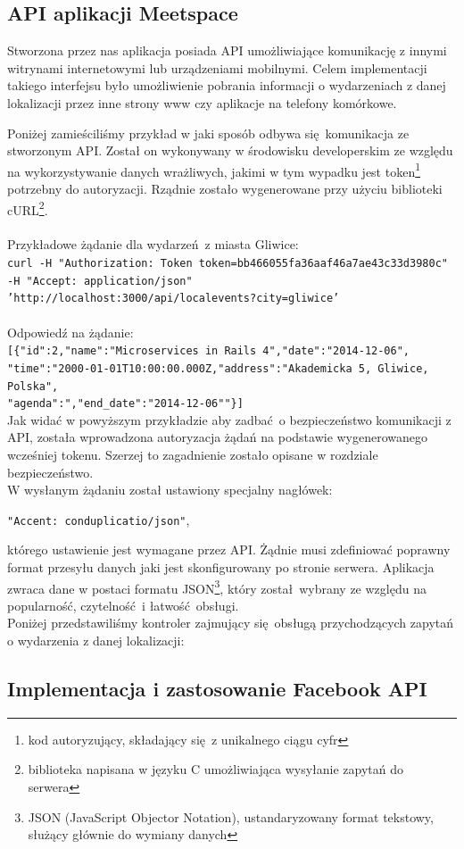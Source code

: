 \subsection{API aplikacji Meetspace}
  Stworzona przez nas aplikacja posiada API umożliwiające komunikację z innymi witrynami internetowymi lub urządzeniami mobilnymi. Celem implementacji takiego interfejsu było umożliwienie pobrania informacji o wydarzeniach z danej lokalizacji przez inne strony www czy aplikacje na telefony komórkowe.


  Poniżej zamieściliśmy przykład w jaki sposób odbywa się komunikacja ze stworzonym API. Został on wykonywany w środowisku developerskim ze względu na wykorzystywanie danych wrażliwych, jakimi w tym wypadku jest token\footnote{kod autoryzujący, składający się z unikalnego ciągu cyfr} potrzebny do autoryzacji. Rządnie zostało wygenerowane przy użyciu biblioteki cURL\footnote{biblioteka napisana w języku C umożliwiająca wysyłanie zapytań do serwera}.
  \\ \\
  Przykładowe żądanie dla wydarzeń z miasta Gliwice:\\
    \texttt{curl -H "Authorization: Token token=bb466055fa36aaf46a7ae43c33d3980c"
    -H "Accept: application/json"\\
    'http://localhost:3000/api/localevents?city=gliwice'}\\ \\
  Odpowiedź na żądanie:\\
    \texttt{[\{"id":2,"name":"Microservices in Rails 4","date":"2014-12-06",\\
    "time":"2000-01-01T10:00:00.000Z,"address":"Akademicka 5, Gliwice, Polska",\\
    "agenda":","end\_{}date":"2014-12-06""\}]}\\

  Jak widać w powyższym przykładzie aby zadbać o bezpieczeństwo komunikacji z API, została wprowadzona autoryzacja żądań na podstawie wygenerowanego wcześniej tokenu. Szerzej to zagadnienie zostało opisane w rozdziale bezpieczeństwo.\\
  W wysłanym żądaniu został ustawiony specjalny  nagłówek:
  \begin{center}
    \texttt{"Accent: conduplicatio/json"},
  \end{center}
  którego ustawienie jest wymagane przez API. Żądnie musi zdefiniować poprawny format przesyłu danych jaki jest skonfigurowany po stronie serwera.
  Aplikacja zwraca dane w postaci formatu JSON\footnote{JSON (JavaScript Objector Notation), ustandaryzowany format tekstowy, służący głównie do wymiany danych\cite{json}}, który został wybrany ze względu na popularność, czytelność i łatwość obsługi.\\
  Poniżej przedstawiliśmy kontroler zajmujący się obsługą przychodzących zapytań o wydarzenia z danej lokalizacji:\\

  

\subsection{Implementacja i zastosowanie Facebook API}
